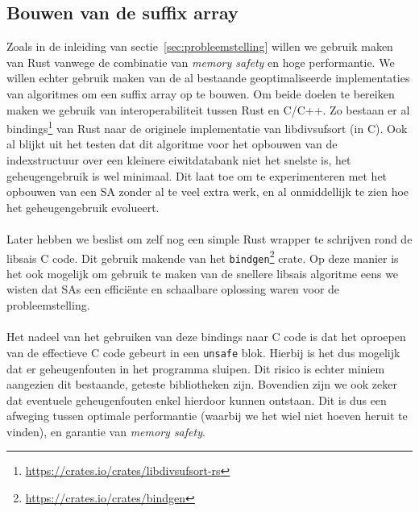 \subsection{Bouwen van de suffix array}\label{subsec:bouwen-van-de-suffix-array}
Zoals in de inleiding van sectie~\ref{sec:probleemstelling} willen we gebruik maken van Rust vanwege de combinatie van \textit{memory safety} en hoge performantie.
We willen echter gebruik maken van de al bestaande geoptimaliseerde implementaties van algoritmes om een suffix array op te bouwen.
Om beide doelen te bereiken maken we gebruik van interoperabiliteit tussen Rust en C/C++.
Zo bestaan er al bindings\footnote{\url{https://crates.io/crates/libdivsufsort-rs}} van Rust naar de originele implementatie van libdivsufsort\cite{libdivsufsort} (in C).
Ook al blijkt uit het testen dat dit algoritme voor het opbouwen van de indexstructuur over een kleinere eiwitdatabank niet het snelste is, het geheugengebruik is wel minimaal.
Dit laat toe om te experimenteren met het opbouwen van een SA zonder al te veel extra werk, en al onmiddellijk te zien hoe het geheugengebruik evolueert.
\\ \\
Later hebben we beslist om zelf nog een simple Rust wrapper te schrijven rond de libsais C code.
Dit gebruik makende van het \texttt{bindgen}\footnote{\url{https://crates.io/crates/bindgen}} crate.
Op deze manier is het ook mogelijk om gebruik te maken van de snellere libsais algoritme eens we wisten dat SAs een efficiënte en schaalbare oplossing waren voor de probleemstelling.
\\ \\
Het nadeel van het gebruiken van deze bindings naar C code is dat het oproepen van de effectieve C code gebeurt in een \texttt{unsafe} blok.
Hierbij is het dus mogelijk dat er geheugenfouten in het programma sluipen.
Dit risico is echter miniem aangezien dit bestaande, geteste bibliotheken zijn.
Bovendien zijn we ook zeker dat eventuele geheugenfouten enkel hierdoor kunnen ontstaan.
Dit is dus een afweging tussen optimale performantie (waarbij we het wiel niet hoeven heruit te vinden), en garantie van \textit{memory safety}.

